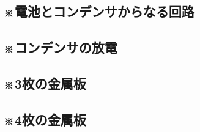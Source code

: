 \documentclass[../../ps_q.tex]{subfiles}
\begin{document}
    \subsection{※電池とコンデンサからなる回路}
        
        \vspace{20pt}
        \vfill
    \subsection{※コンデンサの放電}
        
        \vspace{20pt}
        \vfill
    \subsection{※3枚の金属板}
        
        \vspace{20pt}
        \vfill
    \subsection{※4枚の金属板}
        
        \vspace{20pt}
        \vfill
\end{document}
